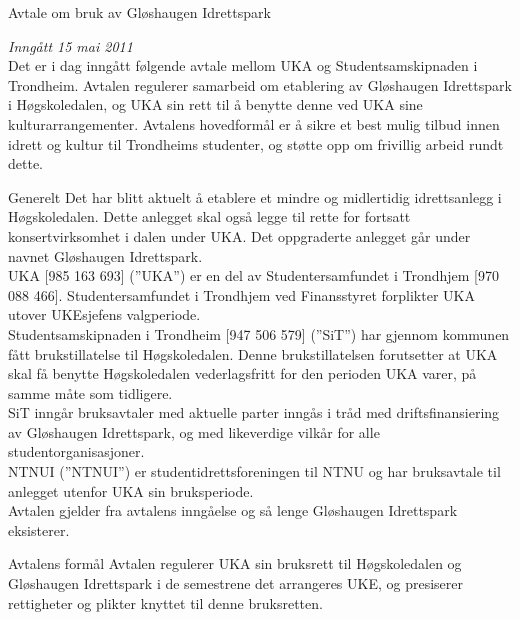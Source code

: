 \documentclass[../fsbok.tex]{subfiles}
\begin{document}
\begin{instruks*}{Avtale om bruk av Gløshaugen Idrettspark}

\emph{Inngått 15 mai 2011}\\



Det er i dag inngått følgende avtale mellom UKA og Studentsamskipnaden i Trondheim. Avtalen regulerer samarbeid om etablering av Gløshaugen Idrettspark i Høgskoledalen, og UKA sin rett til å benytte denne ved UKA sine kulturarrangementer. Avtalens hovedformål er å sikre et best mulig tilbud innen idrett og kultur til Trondheims studenter, og støtte opp om frivillig arbeid rundt dette.


\begin{instruksledd}{Generelt} 
Det har blitt aktuelt å etablere et mindre og midlertidig idrettsanlegg i Høgskoledalen. Dette anlegget skal også legge til rette for fortsatt konsertvirksomhet i dalen under UKA.  Det oppgraderte anlegget går under navnet Gløshaugen Idrettspark.\\ 

UKA [985 163 693] (”UKA”) er en del av Studentersamfundet i Trondhjem [970 088 466]. Studentersamfundet i Trondhjem ved Finansstyret forplikter UKA utover UKEsjefens valgperiode.\\

Studentsamskipnaden i Trondheim [947 506 579] (”SiT”) har gjennom kommunen fått brukstillatelse til Høgskoledalen. Denne brukstillatelsen forutsetter at UKA skal få benytte Høgskoledalen vederlagsfritt for den perioden UKA varer, på samme måte som tidligere.\\  

SiT inngår bruksavtaler med aktuelle parter inngås i tråd med driftsfinansiering av Gløshaugen Idrettspark, og med likeverdige vilkår for alle studentorganisasjoner.\\

NTNUI (”NTNUI”) er studentidrettsforeningen til NTNU og har bruksavtale til anlegget utenfor UKA sin bruksperiode.\\

Avtalen gjelder fra avtalens inngåelse og så lenge Gløshaugen Idrettspark eksisterer.\\
\end{instruksledd}
 
\begin{instruksledd}{Avtalens formål}
Avtalen regulerer UKA sin bruksrett til Høgskoledalen og Gløshaugen Idrettspark i de semestrene det arrangeres UKE, og presiserer rettigheter og plikter knyttet til denne bruksretten.\\
\end{instruksledd}
 

\end{instruks*}
\end{document}
